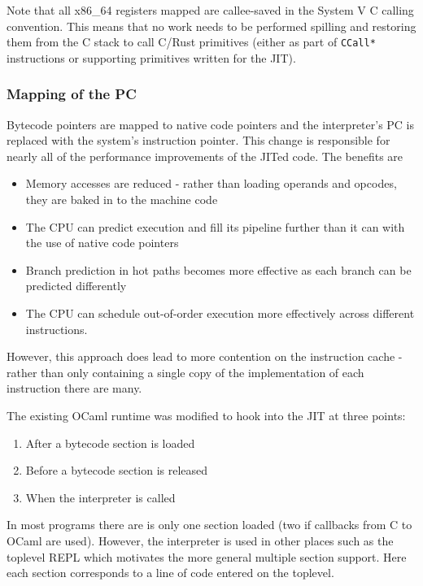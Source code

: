 Note that all x86\_64 registers mapped are callee-saved in the System V C calling convention. This
means that no work needs to be performed spilling and restoring them from the C stack to call
C/Rust
primitives (either as part of \texttt{CCall*} instructions or supporting primitives written for the
JIT).

\subsubsection{Mapping of the PC}

Bytecode pointers are mapped to native code pointers and the interpreter's PC is replaced with the
system's instruction pointer. This change is responsible for nearly all of the performance
improvements of the JITed code. The benefits are

\begin{itemize}
      \item Memory accesses are reduced - rather than loading operands and opcodes, they are baked
            in to the machine code
      \item The CPU can predict execution and fill its pipeline further than it can with the use of
            native code pointers
      \item Branch prediction in hot paths becomes more effective as each branch can be predicted
            differently
      \item The CPU can schedule out-of-order execution more effectively across different
            instructions.
\end{itemize}

However, this approach does lead to more contention on the instruction cache - rather than only
containing a single copy of the implementation of each instruction there are many.


The existing OCaml runtime was modified to hook into the JIT at three points:

\begin{enumerate}
      \item After a bytecode section is loaded
      \item Before a bytecode section is released
      \item When the interpreter is called
\end{enumerate}

In most programs there are is only one section loaded (two if callbacks from C to OCaml are
used). However, the interpreter is used in other places such as the toplevel REPL which motivates
the more general multiple section support. Here each section corresponds to a line of code entered
on the toplevel.


